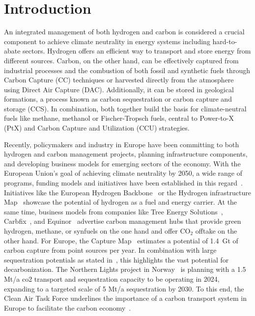 \documentclass[twocolumn]{article}
\newcommand{\carbon}{CO$_2$}
\begin{document}
\section{Introduction}

An integrated management of both hydrogen and carbon is considered a crucial component to achieve climate neutrality in energy systems including hard-to-abate sectors. Hydrogen offers an efficient way to transport and store energy from different sources. Carbon, on the other hand, can be effectively captured from industrial processes and the combustion of both fossil and synthetic fuels through Carbon Capture (CC) techniques or harvested directly from the atmosphere using Direct Air Capture (DAC). Additionally, it can be stored in geological formations, a process known as carbon sequestration or carbon capture and storage (CCS). In combination, both together build the basis for climate-neutral fuels like methane, methanol or Fischer-Tropsch fuels, central to Power-to-X (PtX) and Carbon Capture and Utilization (CCU) strategies.

Recently, policymakers and industry in Europe have been committing to both hydrogen and carbon management projects, planning infrastructure components, and developing business models for emerging sectors of the economy. With the European Union's goal of achieving climate neutrality by 2050, a wide range of programs, funding models and initiatives have been established in this regard~\cite{eu2023netzero,europeangreendeal,europeaninnovationfund}. Initiatives like the European Hydrogen Backbone~\cite{gasforclimateEuropeanHydrogenBackbone2022} or the Hydrogen infrastructure Map~\cite{H2InfrastructureMap} showcase the potential of hydrogen as a fuel and energy carrier. At the same time, business models from companies like Tree Energy Solutions~\cite{TESHydrogenLife2023}, Carbfix~\cite{WeTurnCO2}, and Equinor~\cite{adomaitisEquinorRWEBuild2023} advertise carbon management hubs that provide green hydrogen, methane, or synfuels on the one hand and offer \carbon{} offtake on the other hand. For Europe, the Capture Map~\cite{ToolsGreenTransition} estimates a potential of 1.4~Gt of carbon capture from point sources per year. In combination with large sequestration potentials as stated in~\cite{weiProposedGlobalLayout2021}, this highlights the vast potential for decarbonization. The Northern Lights project in Norway~\cite{NorthernLightsWhat} is planning with a 1.5 Mt/a co2 transport and sequestration capacity to be operating in 2024, expanding to a targeted scale of 5 Mt/a sequestration by 2030.
To this end, the Clean Air Task Force underlines the importance of a carbon transport system in Europe to facilitate the carbon economy~\cite{lockwoodEuropeanStrategyCarbon}.
\end{document}
